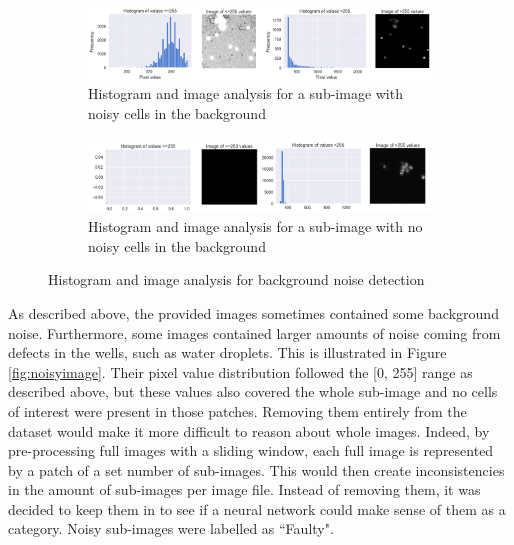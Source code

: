 \begin{figure}[h!]
    \centering
    \begin{subfigure}[h!]{0.99\textwidth}
        \includegraphics[width=\textwidth]{dissertation/figures/background_noise_true.png}
        \caption{Histogram and image analysis for a sub-image with noisy cells in the background}
        \label{fig:bgnoisetrue}
    \end{subfigure}

    \begin{subfigure}[h!]{0.99\textwidth}
        \includegraphics[width=\textwidth]{dissertation/figures/background_noise_false.png}
        \caption{Histogram and image analysis for a sub-image with no noisy cells in the background}
        \label{fig:bgnoisefalse}
    \end{subfigure}

    \caption{Histogram and image analysis for background noise detection}
    \label{fig:bgnoise}

\end{figure}

As described above, the provided images sometimes contained some background noise. Furthermore, some images contained larger amounts of noise coming from defects in the wells, such as water droplets. This is illustrated in Figure \ref{fig:noisyimage}. Their pixel value distribution followed the [0, 255] range as described above, but these values also covered the whole sub-image and no cells of interest were present in those patches. Removing them entirely from the dataset would make it more difficult to reason about whole images. Indeed, by pre-processing full images with a sliding window, each full image is represented by a patch of a set number of sub-images. This would then create inconsistencies in the amount of sub-images per image file. Instead of removing them, it was decided to keep them in to see if a neural network could make sense of them as a category. Noisy sub-images were labelled as ``Faulty".

